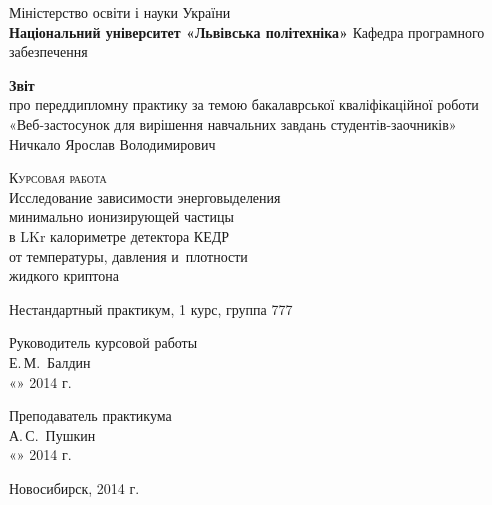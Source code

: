 \begin{titlepage}
  \begin{center}
    \large
    Міністерство освіти і науки України\\
    \textbf{Національний університет «Львівська політехніка»}
    Кафедра програмного забезпечення

    \vfill
      \textbf{Звіт}\\
      про переддипломну практику за темою бакалаврської кваліфікаційної роботи\\
      «Веб-застосунок для вирішення навчальних завдань студентів-заочників»\\
      Ничкало Ярослав Володимирович
    \vfill
 
    \textsc{Курсовая работа}\\[5mm]
     
    {\LARGE Исследование зависимости энерговыделения\\
      минимально ионизирующей частицы\\
    в LKr калориметре детектора КЕДР\\
    от температуры, давления и~плотности\\[2mm]
    жидкого криптона}
  \bigskip
     
    Нестандартный практикум, 1 курс, группа 777
\end{center}
\vfill
 
\newlength{\ML}
\hfill\begin{minipage}{0.4\textwidth}
  Руководитель курсовой работы\\
  \underline{\hspace{\ML}} Е.\,М.~Балдин\\
  «\underline{\hspace{0.7cm}}» \underline{\hspace{2cm}} 2014 г.
\end{minipage}%
\bigskip
 
\hfill\begin{minipage}{0.4\textwidth}
  Преподаватель практикума\\
  \underline{\hspace{\ML}} А.\,С.~Пушкин\\
  «\underline{\hspace{0.7cm}}» \underline{\hspace{2cm}} 2014 г.
\end{minipage}%
\vfill
 
\begin{center}
  Новосибирск, 2014 г.
\end{center}
\end{titlepage}